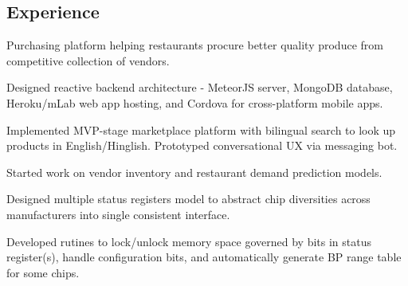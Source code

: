 \documentclass[]{deedy}
\begin{document}
\begin{minipage}[t]{0.69\textwidth}
\begin{flushleft}
%
\section{Experience}
%
\vspace{1.1pt}
\begin{tightemize}
\item Purchasing platform helping restaurants procure better quality produce from competitive collection of vendors.
\item Designed reactive backend architecture - MeteorJS server, MongoDB database, Heroku/mLab web app hosting, and Cordova for cross-platform mobile apps.
\item Implemented MVP-stage marketplace platform with bilingual search to look up products in English/Hinglish. Prototyped conversational UX via messaging bot.
\item Started work on vendor inventory and restaurant demand prediction models.
\end{tightemize}
\sectionsep
%
\vspace{1.1pt}
\begin{tightemize}
\item Designed multiple status registers model to abstract chip diversities across manufacturers into single consistent interface.
\item Developed rutines to lock/unlock memory space governed by bits in status register(s), handle configuration bits, and automatically generate BP range table for some chips.

\end{tightemize}
\end{flushleft}
\end{minipage}
\end{document}
